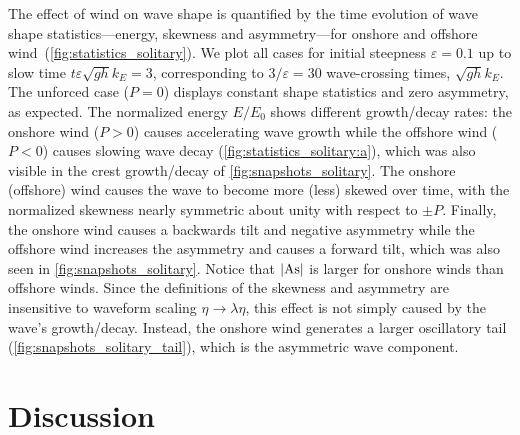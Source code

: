 \documentclass{jfm}
\DeclareMathOperator{\As}{As}
\renewcommand*{\epsilon}{\varepsilon}
\begin{document}
The effect of wind on wave shape is quantified by the time evolution of
wave shape statistics---energy, skewness and asymmetry---for onshore
and offshore wind~(\cref{fig:statistics_solitary}).
We plot all cases for initial steepness $\epsilon = 0.1$ up to slow time
$t \epsilon \sqrt{g h} k_E = 3$, corresponding to $3/\epsilon = 30$
wave-crossing times, $\sqrt{gh} k_E$.
The unforced case ($P=0$) displays constant shape statistics and zero
asymmetry, as expected.
The normalized energy $E/E_0$ shows different growth/decay rates:
the onshore wind ($P>0$) causes accelerating wave growth while the
offshore wind ($P<0$) causes slowing wave decay
(\cref{fig:statistics_solitary:a}), which was also visible in the crest
growth/decay of \cref{fig:snapshots_solitary}.
The onshore (offshore) wind causes the wave to become more (less) skewed
over time, with the normalized skewness nearly symmetric about unity
with respect to $\pm P$.
Finally, the onshore wind causes a backwards tilt and negative asymmetry
while the offshore wind increases the asymmetry and causes a forward
tilt, which was also seen in \cref{fig:snapshots_solitary}.
Notice that $\abs{\As}$ is larger for onshore winds than offshore winds.
Since the definitions of the skewness and asymmetry are insensitive to
waveform scaling $\eta \to \lambda \eta$, this effect is not simply
caused by the wave's growth/decay.
Instead, the onshore wind generates a larger oscillatory tail
(\cref{fig:snapshots_solitary_tail}), which is the asymmetric wave
component.

\section{\label{sec:discussion} Discussion}
\end{document}
